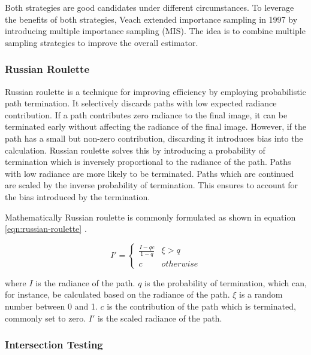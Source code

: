 Both strategies are good candidates under different circumstances. To leverage the benefits of both strategies, Veach extended importance sampling in 1997 \cite{veachMonteCarloLightTransport} by introducing multiple importance sampling (\gls{MIS}). The idea is to combine multiple sampling strategies to improve the overall estimator.

\subsubsection{Russian Roulette}
\label{ch:russianRoulette}

Russian roulette is a technique for improving efficiency by employing probabilistic path termination. It selectively discards paths with low expected radiance contribution. If a path contributes zero radiance to the final image, it can be terminated early without affecting the radiance of the final image. However, if the path has a small but non-zero contribution, discarding it introduces bias into the calculation. Russian roulette solves this by introducing a probability of termination which is inversely proportional to the radiance of the path. Paths with low radiance are more likely to be terminated. Paths which are continued are scaled by the inverse probability of termination. This ensures to account for the bias introduced by the termination.

Mathematically Russian roulette is commonly formulated as shown in equation \ref{eqn:russian-roulette} \cite{Pharr_Physically_Based_Rendering_2023}.

\begin{equation}
  \label{eqn:russian-roulette}
  I' = \begin{cases} \frac{I-qc}{1-q} & \xi > q \\ c & otherwise \end{cases}
\end{equation}
  
where $I$ is the radiance of the path. $q$ is the probability of termination, which can, for instance, be calculated based on the radiance of the path. $\xi$ is a random number between 0 and 1. $c$ is the contribution of the path which is terminated, commonly set to zero. $I'$ is the scaled radiance of the path.

\subsubsection{Intersection Testing}


